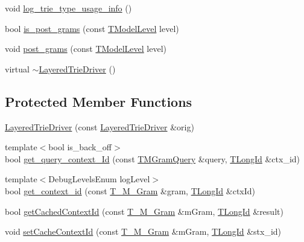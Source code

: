 \begin{DoxyCompactItemize}
\item 
void \hyperlink{classuva_1_1smt_1_1tries_1_1_layered_trie_driver_aa517364127a40f1942dcae633f819304}{log\+\_\+trie\+\_\+type\+\_\+usage\+\_\+info} ()
\item 
bool \hyperlink{classuva_1_1smt_1_1tries_1_1_layered_trie_driver_a178c3021bc5fd5ff9035c6f86a80e2b6}{is\+\_\+post\+\_\+grams} (const \hyperlink{namespaceuva_1_1smt_1_1tries_a20577a44b3a42d26524250634379b7cb}{T\+Model\+Level} level)
\item 
void \hyperlink{classuva_1_1smt_1_1tries_1_1_layered_trie_driver_ad25a2d45904154530dee9ccd0945dd9c}{post\+\_\+grams} (const \hyperlink{namespaceuva_1_1smt_1_1tries_a20577a44b3a42d26524250634379b7cb}{T\+Model\+Level} level)
\item 
virtual \hyperlink{classuva_1_1smt_1_1tries_1_1_layered_trie_driver_afca9b816915b28480c10624b3067ce3c}{$\sim$\+Layered\+Trie\+Driver} ()
\end{DoxyCompactItemize}
\subsection*{Protected Member Functions}
\begin{DoxyCompactItemize}
\item 
\hyperlink{classuva_1_1smt_1_1tries_1_1_layered_trie_driver_a3e49cd9f10938019643370bcf9c85d9c}{Layered\+Trie\+Driver} (const \hyperlink{classuva_1_1smt_1_1tries_1_1_layered_trie_driver}{Layered\+Trie\+Driver} \&orig)
\item 
{\footnotesize template$<$bool is\+\_\+back\+\_\+off$>$ }\\bool \hyperlink{classuva_1_1smt_1_1tries_1_1_layered_trie_driver_ae0f2066edca3e2511809e35223fc0170}{get\+\_\+query\+\_\+context\+\_\+\+Id} (const \hyperlink{classuva_1_1smt_1_1tries_1_1_layered_trie_driver_a260d262d60ecb64e33f39609e4dcfae9}{T\+M\+Gram\+Query} \&query, \hyperlink{namespaceuva_1_1smt_1_1hashing_a5992ac0dea0fb3226fb403ede09fad55}{T\+Long\+Id} \&ctx\+\_\+id)
\item 
{\footnotesize template$<$Debug\+Levels\+Enum log\+Level$>$ }\\bool \hyperlink{classuva_1_1smt_1_1tries_1_1_layered_trie_driver_a24f0de20cf024b090073103099bd76d5}{get\+\_\+context\+\_\+id} (const \hyperlink{structuva_1_1smt_1_1tries_1_1mgrams_1_1_t___m___gram}{T\+\_\+\+M\+\_\+\+Gram} \&gram, \hyperlink{namespaceuva_1_1smt_1_1hashing_a5992ac0dea0fb3226fb403ede09fad55}{T\+Long\+Id} \&ctx\+Id)
\item 
bool \hyperlink{classuva_1_1smt_1_1tries_1_1_layered_trie_driver_aa45ae9734e536721ba527abef4b09880}{get\+Cached\+Context\+Id} (const \hyperlink{structuva_1_1smt_1_1tries_1_1mgrams_1_1_t___m___gram}{T\+\_\+\+M\+\_\+\+Gram} \&m\+Gram, \hyperlink{namespaceuva_1_1smt_1_1hashing_a5992ac0dea0fb3226fb403ede09fad55}{T\+Long\+Id} \&result)
\item 
void \hyperlink{classuva_1_1smt_1_1tries_1_1_layered_trie_driver_a17a46690a7c2c577bbc3379d9705b62e}{set\+Cache\+Context\+Id} (const \hyperlink{structuva_1_1smt_1_1tries_1_1mgrams_1_1_t___m___gram}{T\+\_\+\+M\+\_\+\+Gram} \&m\+Gram, \hyperlink{namespaceuva_1_1smt_1_1hashing_a5992ac0dea0fb3226fb403ede09fad55}{T\+Long\+Id} \&stx\+\_\+id)
\end{DoxyCompactItemize}
